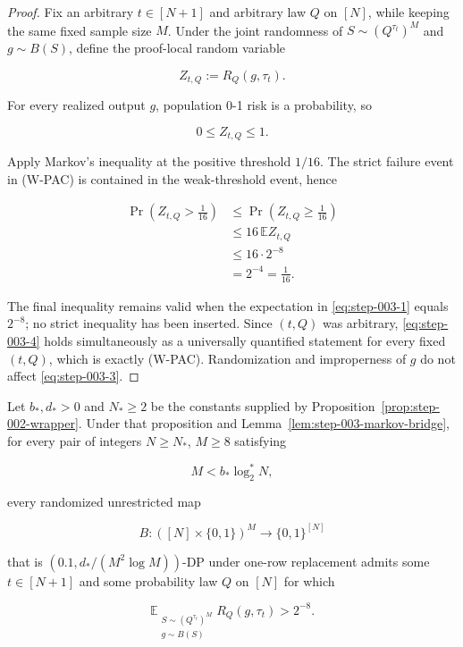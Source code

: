 \begin{proof}
Fix an arbitrary \(t\in[N+1]\) and arbitrary law \(Q\) on \([N]\), while
keeping the same fixed sample size \(M\). Under the joint randomness of
\(S\sim(Q^{\tau_t})^M\) and \(g\sim B(S)\), define the proof-local random
variable

\[
Z_{t,Q}:=R_Q(g,\tau_t).
\]

For every realized output \(g\), population 0-1 risk is a probability, so

\[
0\le Z_{t,Q}\le1.
\tag{S3.3}\label{eq:step-003-3}
\]

Apply Markov's inequality at the positive threshold \(1/16\). The strict
failure event in (W-PAC) is contained in the weak-threshold event, hence

\[
\begin{aligned}
\Pr\!\left(Z_{t,Q}>\frac1{16}\right)
&\le \Pr\!\left(Z_{t,Q}\ge\frac1{16}\right)\\
&\le 16\,\mathbb E Z_{t,Q}\\
&\le 16\cdot2^{-8}\\
&=2^{-4}
=\frac1{16}.
\end{aligned}
\tag{S3.4}\label{eq:step-003-4}
\]

The final inequality remains valid when the expectation in \eqref{eq:step-003-1} equals
\(2^{-8}\); no strict inequality has been inserted. Since \((t,Q)\) was
arbitrary, \eqref{eq:step-003-4} holds simultaneously as a universally quantified statement
for every fixed \((t,Q)\), which is exactly (W-PAC). Randomization and
improperness of \(g\) do not affect \eqref{eq:step-003-3}. \end{proof}

\begin{proposition}\label{prop:step-003-expected-hardness}
Let \(b_*,d_*>0\) and \(N_*\ge2\) be the constants supplied by
Proposition~\ref{prop:step-002-wrapper}. Under that proposition and
Lemma~\ref{lem:step-003-markov-bridge}, for every pair of integers
\(N\ge N_*\), \(M\ge8\) satisfying

\[
M<b_*\log_2^*N,
\]

every randomized unrestricted map

\[
B:([N]\times\{0,1\})^M\to\{0,1\}^{[N]}
\]

that is
\(\left(0.1,d_*/(M^2\log M)\right)\)-DP under one-row replacement admits
some \(t\in[N+1]\) and some probability law \(Q\) on \([N]\) for which

\[
\mathbb E_{\substack{S\sim(Q^{\tau_t})^M\\g\sim B(S)}}
  R_Q(g,\tau_t)
>2^{-8}.
\tag{S3.5}\label{eq:step-003-5}
\]
\end{proposition}

